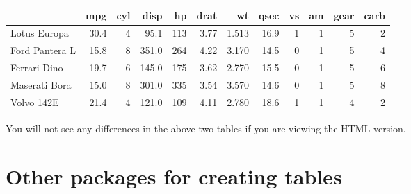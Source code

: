 \documentclass[
  11pt,
]{krantz}
\newenvironment{Shaded}{\begin{snugshade}}{\end{snugshade}}
\newcommand{\DataTypeTok}[1]{\textcolor[rgb]{0.27,0.27,0.27}{#1}}
\newcommand{\KeywordTok}[1]{\textcolor[rgb]{0.27,0.27,0.27}{\textbf{#1}}}
\newcommand{\NormalTok}[1]{#1}
\newcommand{\OperatorTok}[1]{\textcolor[rgb]{0.43,0.43,0.43}{\textbf{#1}}}
\newcommand{\StringTok}[1]{\textcolor[rgb]{0.5,0.5,0.5}{#1}}
\begin{document}
\begin{tabular}{lrrrrrrrrrrr}
\toprule
  & mpg & cyl & disp & hp & drat & wt & qsec & vs & am & gear & carb\\
\midrule
Lotus Europa & 30.4 & 4 & 95.1 & 113 & 3.77 & 1.513 & 16.9 & 1 & 1 & 5 & 2\\
Ford Pantera L & 15.8 & 8 & 351.0 & 264 & 4.22 & 3.170 & 14.5 & 0 & 1 & 5 & 4\\
Ferrari Dino & 19.7 & 6 & 145.0 & 175 & 3.62 & 2.770 & 15.5 & 0 & 1 & 5 & 6\\
Maserati Bora & 15.0 & 8 & 301.0 & 335 & 3.54 & 3.570 & 14.6 & 0 & 1 & 5 & 8\\
Volvo 142E & 21.4 & 4 & 121.0 & 109 & 4.11 & 2.780 & 18.6 & 1 & 1 & 4 & 2\\
\bottomrule
\end{tabular}

\begin{Shaded}
\end{Shaded}

\begin{table}[H]
\centering
{}
\end{table}

You will not see any differences in the above two tables if you are viewing the HTML version.

\hypertarget{table-other}{%
\section{Other packages for creating tables}\label{table-other}}
\end{document}
